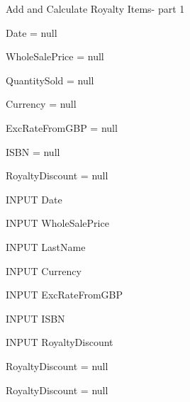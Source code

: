 \begin{algorithm}[H]
    \caption{Add and Calculate Royalty Items- part 1}
\begin{algorithmic}[1]


Date = null

WholeSalePrice = null

QuantitySold = null

Currency = null

ExcRateFromGBP = null

ISBN = null

RoyaltyDiscount = null


    INPUT Date

\EndWhile


    INPUT WholeSalePrice

\EndWhile


    INPUT LastName

\EndWhile


    INPUT Currency

\EndWhile



        INPUT ExcRateFromGBP

    \EndWhile

\EndIf


    INPUT ISBN

\EndWhile


    INPUT RoyaltyDiscount


        RoyaltyDiscount = null

    \EndIf


        RoyaltyDiscount = null

    \EndIf

\EndWhile

\end{algorithmic}
\end{algorithm}

